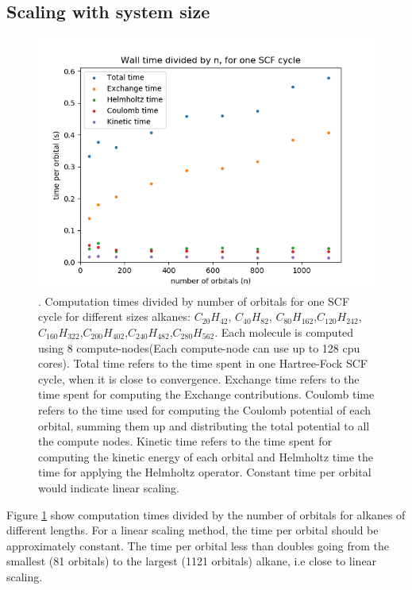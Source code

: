 \documentclass{article}
\begin{document}
\subsection{Scaling with system size}

\begin{figure}
\centering
\includegraphics[width=1.\textwidth]{Times_nAlkanes.png}
\caption{\label{fig01}. Computation times divided by number of orbitals for one SCF cycle for different sizes alkanes: $C_{20}H_{42}$, $C_{40}H_{82}$, $C_{80}H_{162}$,$ C_{120}H_{242}$,$ C_{160}H_{322}$,$ C_{200}H_{402}$,$ C_{240}H_{482}$,$ C_{280}H_{562}$. Each molecule is computed using 8 compute-nodes(Each compute-node can use up to 128 cpu cores). Total time refers to the time spent in one Hartree-Fock SCF cycle, when it is close to convergence. Exchange time refers to the time spent for computing the Exchange contributions. Coulomb time refers to the time used for computing the Coulomb potential of each orbital, summing them up and distributing the total potential to all the compute nodes. Kinetic time refers to the time spent for computing the kinetic energy of each orbital  and Helmholtz time the time for applying the Helmholtz operator. Constant time per orbital would indicate linear scaling.}
\end{figure}

Figure \ref{fig01} show computation times divided by the number of orbitals for alkanes of different lengths. For a linear scaling method, the time per orbital should be approximately constant.  The time per orbital less than doubles going from the smallest (81 orbitals) to the largest (1121 orbitals) alkane, i.e close to linear scaling. 
\end{document}
